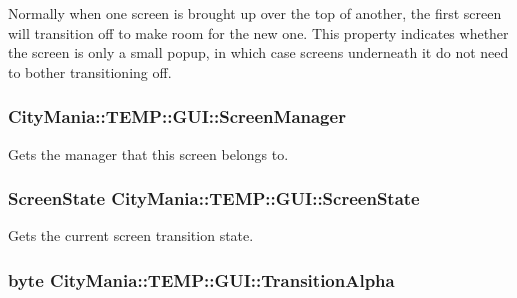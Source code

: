 Normally when one screen is brought up over the top of another, the first screen will transition off to make room for the new one. This property indicates whether the screen is only a small popup, in which case screens underneath it do not need to bother transitioning off. \hypertarget{classCityMania_1_1TEMP_1_1GUI_acf9604498f35aa0bc54fc0c6fedbb52a}{
\subsubsection[{ScreenManager}]{ CityMania::TEMP::GUI::ScreenManager}}
\label{classCityMania_1_1TEMP_1_1GUI_acf9604498f35aa0bc54fc0c6fedbb52a}


Gets the manager that this screen belongs to. \hypertarget{classCityMania_1_1TEMP_1_1GUI_ab17acbc6021aebb97197d8c162634f0e}{
\subsubsection[{ScreenState}]{\setlength{\rightskip}{0pt plus 5cm}ScreenState CityMania::TEMP::GUI::ScreenState}}
\label{classCityMania_1_1TEMP_1_1GUI_ab17acbc6021aebb97197d8c162634f0e}


Gets the current screen transition state. \hypertarget{classCityMania_1_1TEMP_1_1GUI_a950bc5d9d92d045af5678505d69a093b}{
\subsubsection[{TransitionAlpha}]{\setlength{\rightskip}{0pt plus 5cm}byte CityMania::TEMP::GUI::TransitionAlpha}}
\label{classCityMania_1_1TEMP_1_1GUI_a950bc5d9d92d045af5678505d69a093b}


